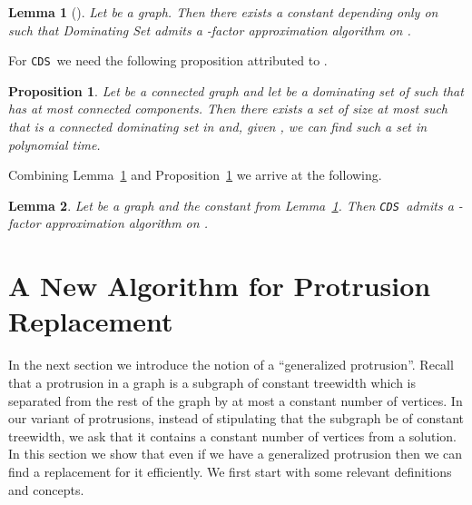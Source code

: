 \documentclass[11pt]{article}
\newtheorem{proposition}{Proposition}
\newtheorem{lemma}{Lemma}
\newcommand{\tCDS}{{\texttt{\sc CDS}}}
\begin{document}
\begin{lemma}[\cite{Dvorak13}]
\label{lemma:approximation}
Let  be a   graph. Then there exists a constant  depending only on  such that 
{\sc Dominating Set}  admits  a -factor approximation algorithm on  . 
\end{lemma}


For \tCDS \,  we  need the following proposition attributed to \cite{Duchet82}.
\begin{proposition}
\label{lem:bb}
Let  be a connected graph and let  be a dominating set of  such that  has at most  connected components. Then 
there exists a set  of size  at most   
 such that  is a connected dominating set in  and, given , we can find such a set  in polynomial time. 
\end{proposition}

Combining Lemma~\ref{lemma:approximation} and Proposition~\ref{lem:bb} we arrive at the following. 
\begin{lemma}
\label{lemma:approximationcds}
Let  be a   graph and  the constant from  Lemma~\ref{lemma:approximation}. Then
\tCDS \,  admits  a -factor approximation algorithm on  . 
\end{lemma}





\section{A New Algorithm for Protrusion Replacement}
\label{sec:gens:protrs}


In the next section we introduce the notion of a ``generalized protrusion''.  Recall that a protrusion in a graph  is a subgraph of constant treewidth which is separated from the rest of the graph by at most a constant number of vertices. In our variant of protrusions, instead of stipulating that the subgraph be of constant treewidth, we ask that it contains a  constant number of vertices from a solution. In this section we show that even if we have a generalized protrusion then we can find a replacement for it efficiently.  
We first start with some relevant definitions and concepts. 
\end{document}
